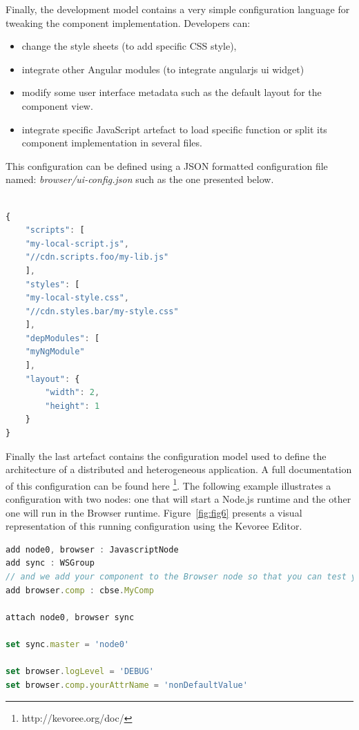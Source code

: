 Finally, the development model contains a very simple configuration language for tweaking the component implementation. Developers can: 

\begin{itemize}
	\item change the style sheets (to add specific CSS style), 
	\item integrate other Angular modules (to integrate angularjs ui widget)  
	\item modify some user interface metadata such as the default layout for the component view. 
	\item integrate specific JavaScript artefact to load specific function or split its component implementation in several files. 
	\end{itemize}
 
 
This configuration can be defined using a JSON formatted configuration file named: \emph{browser/ui-config.json} such as the one presented below.
 
\begin{lstlisting}[language=JavaScript,numbers=right,firstnumber=1,basicstyle=\scriptsize,deletekeywords={port},frame=none,caption={Excerpt of the component configuration}]

{
	"scripts": [
	"my-local-script.js",
	"//cdn.scripts.foo/my-lib.js"
	],
	"styles": [
	"my-local-style.css",
	"//cdn.styles.bar/my-style.css"
	],
	"depModules": [
	"myNgModule"
	],
	"layout": {
		"width": 2,
		"height": 1
	}
}
\end{lstlisting}

Finally the last artefact contains the configuration model used to define the architecture of a distributed and heterogeneous application. A full documentation of this configuration can be found here \footnote{http://kevoree.org/doc/}. The following example  illustrates a configuration with two nodes: one that will start a Node.js runtime  and the other one will run in the Browser runtime. Figure~\ref{fig:fig6} presents a visual representation of this running configuration using the Kevoree Editor. 


\begin{lstlisting}[language=JavaScript,numbers=right,firstnumber=1,basicstyle=\scriptsize,morekeywords={add,attach,set,network},frame=none,caption={Excerpt of the application initial configuration}]
add node0, browser : JavascriptNode
add sync : WSGroup
// and we add your component to the Browser node so that you can test your UI
add browser.comp : cbse.MyComp

attach node0, browser sync

set sync.master = 'node0'

set browser.logLevel = 'DEBUG'
set browser.comp.yourAttrName = 'nonDefaultValue'

\end{lstlisting}

